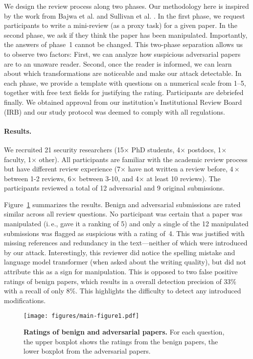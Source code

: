 \documentclass[letterpaper,twocolumn,10pt]{article}
\newcommand{\ie}{i.\,e.}
\begin{document}
We design the review process along two phases. Our methodology here is inspired by the work from Bajwa et al. \cite{bajwa-2019-might} and Sullivan et al. \cite{sullivan-10-reviewer}. In the first phase, we request participants to write a mini-review (as a proxy task) for a given paper. In the second phase, we ask if they think the paper has been manipulated. Importantly, the answers of phase~1 cannot be changed. This two-phase separation allows us to observe two factors: First, we can analyze how suspicious adversarial papers are to an unaware reader. Second, once the reader is informed, we can learn about which transformations are noticeable and make our attack detectable.
In each phase, we provide a template with questions on a numerical scale from 1--5, together with free text fields for justifying the rating.
Participants are debriefed finally.
We obtained approval from our institution's Institutional Review Board (IRB) and our study protocol was deemed to comply with all  regulations.

\paragraph{Results.} We recruited 21 security researchers (15$\times$ PhD students, 4$\times$ postdocs, 1$\times$ faculty, 1$\times$ other). All participants are familiar with the academic review process but have different review experience (7$\times$ have not written a review before, $4\times$ between 1-2 reviews, 6$\times$ between 3-10, and 4$\times$ at least 10 reviews). 
The participants reviewed a total of 12 adversarial and 9 original submissions.

Figure~\ref{fig:user-study-v2} summarizes the results. Benign and adversarial submissions are rated similar across all review questions. No participant was certain that a paper was manipulated (\ie, gave it a ranking of 5) and only a single of the 12 manipulated submissions was flagged as suspicious with a rating of~4. This was justified with missing references and redundancy in the text---neither of which were introduced by our attack. Interestingly, this reviewer did notice the spelling mistake and language model transformer (when asked about the writing quality), but did not attribute this as a sign for manipulation. This is opposed to two false positive ratings of benign papers, which results in a overall detection precision of 33\% with a recall of only 8\%. This highlights the difficulty to detect any introduced modifications.

\begin{figure}[t]
    \centering
\texttt{[image: figures/main-figure1.pdf]}
    \vspace{-0.75em}
    \caption{\textbf{Ratings of benign and adversarial papers.} For each question, the upper boxplot shows the ratings from the benign papers, the lower boxplot from the adversarial papers.}
    \label{fig:user-study-v2}
\end{figure}
\end{document}
